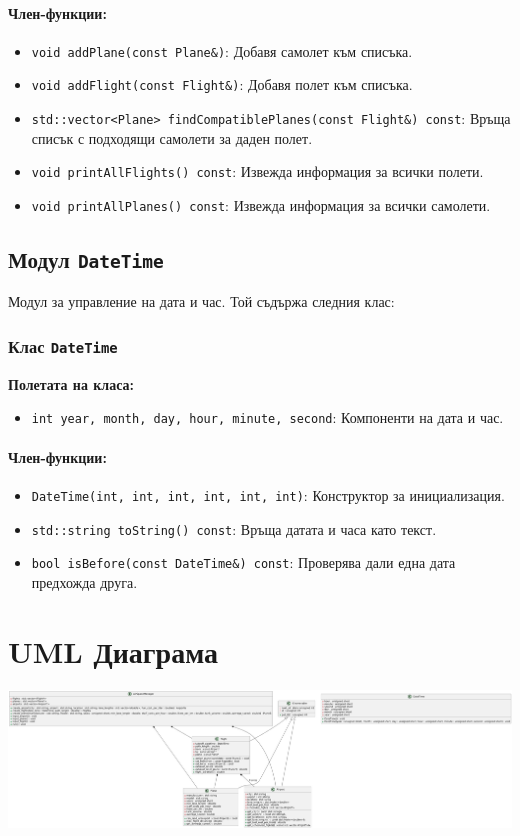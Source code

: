 \documentclass[a4paper,12pt]{article}
\begin{document}
\paragraph*{Член-функции:}
\begin{itemize}
    \item \texttt{void addPlane(const Plane\&)}: Добавя самолет към списъка.
    \item \texttt{void addFlight(const Flight\&)}: Добавя полет към списъка.
    \item \texttt{std::vector<Plane> findCompatiblePlanes(const Flight\&) const}: Връща списък с подходящи самолети за даден полет.
    \item \texttt{void printAllFlights() const}: Извежда информация за всички полети.
    \item \texttt{void printAllPlanes() const}: Извежда информация за всички самолети.
\end{itemize}

\subsection{Модул \texttt{DateTime}}
Модул за управление на дата и час. Той съдържа следния клас:

\subsubsection*{Клас \texttt{DateTime}}
\textbf{Полетата на класа:}
\begin{itemize}
    \item \texttt{int year, month, day, hour, minute, second}: Компоненти на дата и час.
\end{itemize}

\paragraph*{Член-функции:}
\begin{itemize}
    \item \texttt{DateTime(int, int, int, int, int, int)}: Конструктор за инициализация.
    \item \texttt{std::string toString() const}: Връща датата и часа като текст.
    \item \texttt{bool isBefore(const DateTime\&) const}: Проверява дали една дата предхожда друга.
\end{itemize}

\section{UML Диаграма}
\includegraphics[width=\textwidth]{uml_diagram.jpg} %
\end{document}
